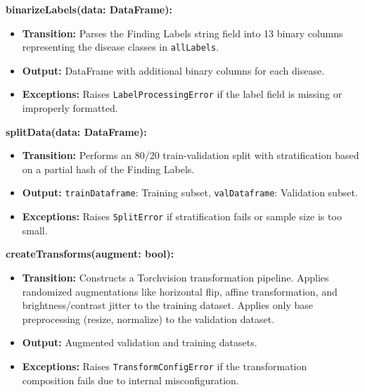 \documentclass[12pt, titlepage]{article}
\begin{document}
\textbf{binarizeLabels(data: DataFrame):}
\begin{itemize}
    \item \textbf{Transition:} Parses the Finding Labels string field into 13 binary columns representing the disease classes in \texttt{allLabels}.
    \vspace{0.1cm}
    \item \textbf{Output:} DataFrame with additional binary columns for each disease.
    \vspace{0.1cm}
    \item \textbf{Exceptions:} Raises \texttt{LabelProcessingError} if the label field is missing or improperly formatted.
\end{itemize}

\textbf{splitData(data: DataFrame):}
\begin{itemize}
    \item \textbf{Transition:} Performs an 80/20 train-validation split with stratification based on a partial hash of the Finding Labels.
    \vspace{0.1cm}
    \item \textbf{Output:} \texttt{trainDataframe}: Training subset, \texttt{valDataframe}: Validation subset.
    \vspace{0.1cm}
    \item \textbf{Exceptions:} Raises \texttt{SplitError} if stratification fails or sample size is too small.
\end{itemize}

\textbf{createTransforms(augment: bool):}
\begin{itemize}
    \item \textbf{Transition:} Constructs a Torchvision transformation pipeline. Applies randomized augmentations like horizontal flip, affine transformation, and brightness/contrast jitter to the training dataset. Applies only base preprocessing (resize, normalize) to the validation dataset.
    \vspace{0.1cm}
    \item \textbf{Output:} Augmented validation and training datasets.
    \vspace{0.1cm}
    \item \textbf{Exceptions:} Raises \texttt{TransformConfigError} if the transformation composition fails due to internal misconfiguration.
\end{itemize}
\end{document}
